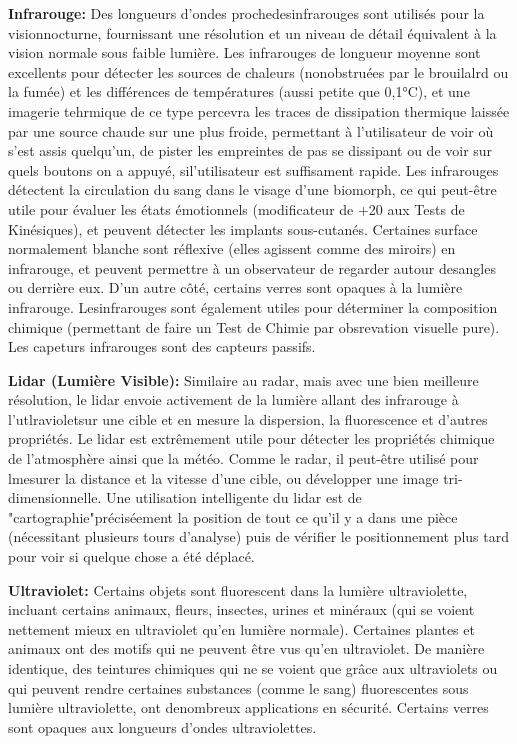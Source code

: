 \textbf{Infrarouge:} Des longueurs d'ondes prochedesinfrarouges sont utilisés pour la visionnocturne, fournissant une résolution et un niveau de détail équivalent à la vision normale sous faible lumière. Les infrarouges de longueur moyenne sont excellents pour détecter les sources de chaleurs (nonobstruées par le brouilalrd ou la fumée) et les différences de températures (aussi petite que 0,1°C), et une imagerie tehrmique de ce type percevra les traces de dissipation thermique laissée par une source chaude sur une plus froide, permettant à l'utilisateur de voir où s'est assis quelqu'un, de pister les empreintes de pas se dissipant ou de voir sur quels boutons on a appuyé, sil'utilisateur est suffisament rapide. Les infrarouges détectent la circulation du sang dans le visage d'une biomorph, ce qui peut-être utile pour évaluer les états émotionnels (modificateur de +20 aux Tests de Kinésiques), et peuvent détecter les implants sous-cutanés. Certaines surface normalement blanche sont réflexive (elles agissent comme des miroirs) en infrarouge, et peuvent permettre à un observateur de regarder autour desangles ou derrière eux. D'un autre côté, certains verres sont opaques à la lumière infrarouge. Lesinfrarouges sont également utiles pour déterminer la composition chimique (permettant de faire un Test de Chimie par obsrevation visuelle pure). Les capeturs infrarouges sont des capteurs passifs. 

\textbf{Lidar (Lumière Visible):} Similaire au radar, mais avec une bien meilleure résolution, le lidar envoie activement de la lumière allant des infrarouge à l'utlravioletsur une cible et en mesure la dispersion, la fluorescence et d'autres propriétés. Le lidar est extrêmement utile pour détecter les propriétés chimique de l'atmosphère ainsi que la météo. Comme le radar, il peut-être utilisé pour lmesurer la distance et la vitesse d'une cible, ou développer une image tri-dimensionnelle. Une utilisation intelligente du lidar est de "cartographie"préciséement la position de tout ce qu'il y a dans une pièce (nécessitant plusieurs tours d'analyse) puis de vérifier le positionnement plus tard pour voir si quelque chose a été déplacé. 

\textbf{Ultraviolet:} Certains objets sont fluorescent dans la lumière ultraviolette, incluant certains animaux, fleurs, insectes, urines et minéraux (qui se voient nettement mieux en ultraviolet qu'en lumière normale). Certaines plantes et animaux ont des motifs qui ne peuvent être vus qu'en ultraviolet. De manière identique, des teintures chimiques qui ne se voient que grâce aux ultraviolets ou qui peuvent rendre certaines substances (comme le sang) fluorescentes sous lumière ultraviolette, ont denombreux applications en sécurité. Certains verres sont opaques aux longueurs d'ondes ultraviolettes. 

